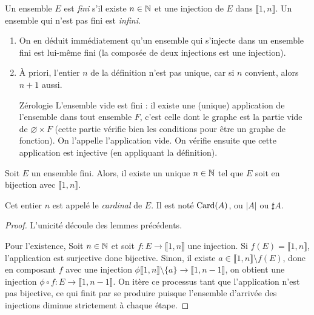 \begin{definition}
Un ensemble $E$ est \emph{fini} s'il existe $n\in \mathbb{N}$ et une injection de $E$ dans $\llbracket 1,n\rrbracket$. Un ensemble qui n'est pas fini est \emph{infini}.
\end{definition}

\begin{remarque}
\begin{enumerate}[label=\alph*)]
\item On en déduit immédiatement qu'un ensemble qui s'injecte dans un ensemble fini est lui-même fini (la composée de deux injections est une injection).
\item À priori, l'entier $n$ de la définition n'est pas unique, car si $n$ convient, alors $n+1$ aussi.
\item [Zérologie] L'ensemble vide est fini : il existe une (unique) application de l'ensemble dans tout ensemble $F$, c'est celle dont le graphe est la partie vide de $\varnothing\times F$ (cette partie vérifie bien les conditions pour être un graphe de fonction). On l'appelle \og l'application vide\fg.
On vérifie ensuite que cette application est injective (en appliquant la définition).
\end{enumerate}
\end{remarque}


\begin{propdef}
Soit $E$ un ensemble fini. Alors, il existe un unique $n\in \mathbb{N}$ tel que $E$ soit en bijection avec $\llbracket 1,n\rrbracket$.

Cet entier $n$ est appelé le \emph{cardinal} de $E$. Il est noté $\operatorname{Card}(A)$, ou $|A|$ ou $\sharp A$.
\end{propdef}
\begin{proof}
L'unicité découle des lemmes précédents.

Pour l'existence, Soit $n\in \mathbb{N}$ et soit $f : E\to \llbracket 1,n\rrbracket$ une injection.
Si $f(E) = \llbracket 1,n\rrbracket$, l'application est surjective donc bijective.
Sinon, il existe $a\in \llbracket 1,n\rrbracket \setminus f(E)$, donc en composant $f$ avec une injection $\phi \llbracket 1,n\rrbracket \setminus \{a\} \to \llbracket 1,n-1\rrbracket$, on obtient une injection $\phi\circ f : E \to \llbracket 1,n-1\rrbracket$.
On itère ce processus tant que l'application n'est pas bijective, ce qui finit par se produire puisque l'ensemble d'arrivée des injections diminue strictement à chaque étape.
\end{proof}




